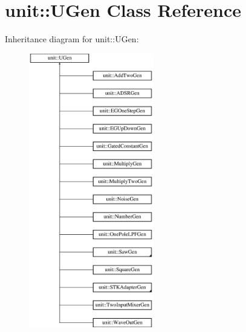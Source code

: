 \hypertarget{classunit_1_1UGen}{}\section{unit\+:\+:U\+Gen Class Reference}
\label{classunit_1_1UGen}
Inheritance diagram for unit\+:\+:U\+Gen\+:\begin{figure}[H]
\begin{center}
\leavevmode
\includegraphics[height=12.000000cm]{classunit_1_1UGen}
\end{center}
\end{figure}
